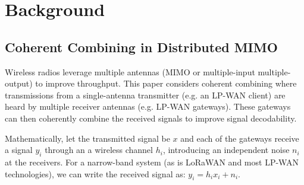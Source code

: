 \section{Background}
\label{sec:background}

\subsection{Coherent Combining in Distributed MIMO}
\label{sec:simo}

Wireless radios leverage multiple antennas (MIMO or multiple-input multiple-output) to improve throughput. This paper considers coherent combining where transmissions from a single-antenna transmitter (e.g. an LP-WAN client) are heard by multiple receiver antennas (e.g. LP-WAN gateways). These gateways can then coherently combine the received signals to improve signal decodability. 




Mathematically, let the transmitted signal be $x$ and each of the gateways receive a signal $y_i$ through an a wireless channel $h_i$, introducing an independent noise $n_i$ at the receivers. For a narrow-band system (as is LoRaWAN and most LP-WAN technologies), we can write the received signal as: $y_i = h_i x_i + n_i $. 


